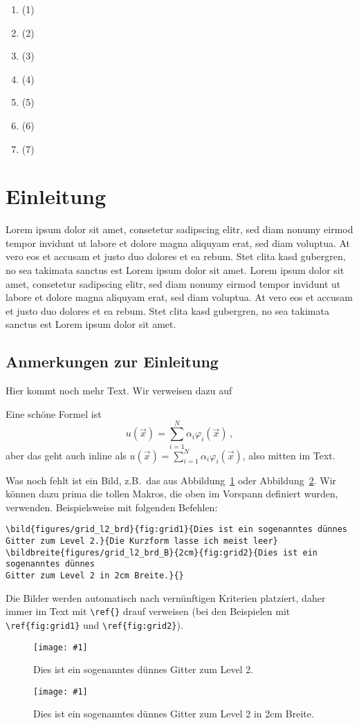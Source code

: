 \documentclass[a4paper,12pt]{llncs}
\numberwithin{equation}{section}
\newcommand{\bild}[4]{
  \begin{figure}[htbp]
    \begin{center}
      \texttt{[image: \#1]}
      \caption[#4]{#3}
      \label{#2}
    \end{center}
  \end{figure}
}
\newcommand{\bildbreite}[5]{
  \begin{figure}[htbp]
    \begin{center}
      \texttt{[image: \#1]}
      \caption[#5]{#4}
      \label{#3}
    \end{center}
  \end{figure}
}
\begin{document}
\begin{enumerate}
\item \cite{Rauber.2012} (1)
\item \cite{Lindholm.2008} (2)
\item \cite{Burgess.2020} (3)
\item \cite{Huang.2008} (4)
\item \cite{Bialas.2016} (5)
\item \cite{Khronos.2019} (6)
\item \cite{Wang.2019} (7)
\end{enumerate}



\section{Einleitung}
Lorem ipsum dolor sit amet, consetetur sadipscing elitr, sed diam nonumy eirmod tempor invidunt ut labore et dolore magna aliquyam erat, sed diam voluptua. At vero eos et accusam et justo duo dolores et ea rebum. Stet clita kasd gubergren, no sea takimata sanctus est Lorem ipsum dolor sit amet. Lorem ipsum dolor sit amet, consetetur sadipscing elitr, sed diam nonumy eirmod tempor invidunt ut labore et dolore magna aliquyam erat, sed diam voluptua. At vero eos et accusam et justo duo dolores et ea rebum. Stet clita kasd gubergren, no sea takimata sanctus est Lorem ipsum dolor sit amet.

\subsection{Anmerkungen zur Einleitung}
Hier kommt noch mehr Text. Wir verweisen dazu auf

Eine schöne Formel ist
\[
u(\vec{x}) = \sum_{i=1}^N \alpha_i \varphi_i(\vec{x}) \,,
\]
aber das geht auch inline als $u(\vec{x}) = \sum_{i=1}^N \alpha_i
\varphi_i(\vec{x})$, also mitten im Text.

Was noch fehlt ist ein Bild, z.B.\ das aus
Abbildung~\ref{fig:grid1} oder Abbildung~\ref{fig:grid2}. Wir können dazu prima die tollen Makros,
die oben im Vorspann definiert wurden, verwenden. Beispielsweise mit
folgenden Befehlen:
\begin{verbatim}
\bild{figures/grid_l2_brd}{fig:grid1}{Dies ist ein sogenanntes dünnes
Gitter zum Level 2.}{Die Kurzform lasse ich meist leer}
\bildbreite{figures/grid_l2_brd_B}{2cm}{fig:grid2}{Dies ist ein sogenanntes dünnes
Gitter zum Level 2 in 2cm Breite.}{}
\end{verbatim}
Die Bilder werden automatisch nach vernünftigen Kriterien platziert,
daher immer im Text mit \verb!\ref{}! drauf verweisen (bei den
Beispielen mit \verb!\ref{fig:grid1}! und \verb!\ref{fig:grid2}!).
\bild{figures/grid_l2_brd}{fig:grid1}{Dies ist ein sogenanntes dünnes
  Gitter zum Level 2.}{Die Kurzform lasse ich meist leer}
\bildbreite{figures/grid_l2_brd}{2cm}{fig:grid2}{Dies ist ein sogenanntes dünnes
Gitter zum Level 2 in 2cm Breite.}{}
\end{document}
